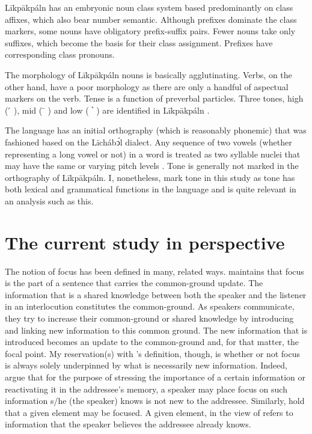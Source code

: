 \documentclass[output=paper,colorlinks,citecolor=brown]{langscibook}
\begin{document}
Līkpākpáln has an embryonic noun class system based predominantly on class affixes, which also bear number semantic. Although prefixes dominate the class markers, some nouns have obligatory prefix-suffix pairs. Fewer nouns take only suffixes, which become the basis for their class assignment. Prefixes have corresponding class pronouns.

The morphology of Līkpākpáln nouns is basically agglutinating. Verbs, on the other hand, have a poor morphology as there are only a handful of aspectual markers on the verb. Tense is a function of preverbal particles. Three tones, high ( ́  ), mid ( ̄  ) and low ( ՝ ) are identified in Līkpākpáln \citep[16]{SteeleWeed1966}.

The language has an initial orthography (which is reasonably phonemic) that was fashioned based on the Līchábͻ́l dialect. Any sequence of two vowels (whether representing a long vowel or not) in a word is treated as two syllable nuclei that may have the same or varying pitch levels \citep{BisilkiAkpanglo-Nartey2017}. Tone is generally not marked in the orthography of Līkpākpáln. I, nonetheless, mark tone in this study as tone has both lexical and grammatical functions in the language and is quite relevant in an analysis such as this.

\section{The current study in perspective}\label{sec:bisilki:3}

The notion of focus has been defined in many, related ways. \citet[92]{VanPutten2016} maintains that focus is the part of a sentence that carries the common-ground update. The information that is a shared knowledge between both the speaker and the listener in an interlocution constitutes the common-ground. As speakers communicate, they try to increase their common-ground or shared knowledge by introducing and linking new information to this common ground. The new information that is introduced becomes an update to the common-ground and, for that matter, the focal point. My reservation(s) with \citeauthor{VanPutten2016}’s definition, though, is whether or not focus is always solely underpinned by what is necessarily new information. Indeed, \citet[59]{DikVanderHulst1981} argue that for the purpose of stressing the importance of a certain information or reactivating it in the addressee’s memory, a speaker may place focus on such information s/he (the speaker) knows is not new to the addressee. Similarly, \citet[3]{SkopeteasEtAl2006} hold that a given element may be focused. A given element, in the view of \citet[2]{SkopeteasEtAl2006} refers to information that the speaker believes the addressee already knows.
\end{document}
